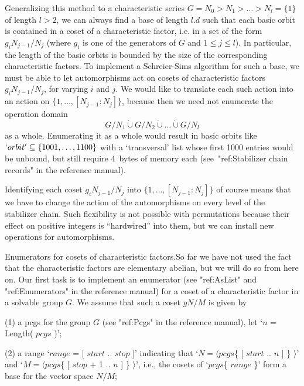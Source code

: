 Generalizing this method to a characteristic series $G=N_0 > N_1 > \ldots
> N_l=\{1\}$ of length $l>2$, we  can always find  a base of length $l.d$
such that each  basic orbit is  contained in a  coset of a characteristic
factor, i.e. in a set of the form $g_iN_{j-1}/N_j$ (where $g_i$ is one of
the generators  of $G$ and $1\le j\le  l$). In particular, the  length of
the basic  orbits   is  bounded   by  the  size  of    the  corresponding
characteristic factors. To implement a Schreier-Sims algorithm for such a
base, we  must  be   able  to  let   automorphisms  act  on   cosets   of
characteristic  factors $g_iN_{j-1}/N_j$, for  varying  $i$  and $j$.  We
would    like to    translate each such     action  into  an  action   on
$\{1,\ldots,[N_{j-1}\mathbin: N_j]\}$, because then we need not enumerate
the operation domain
$$
   G/N_1 \mathbin{\dot\cup} G/N_2 \mathbin{\dot\cup} \ldots %
         \mathbin{\dot\cup} G/N_l 
$$
as a whole. Enumerating it  as a whole would result  in basic orbits like
$`orbit'\subseteq \{1001,\ldots,1100\}$  with a  `transversal' list whose
first 1000 entries would be unbound, but  still require 4~bytes of memory
each (see~"ref:Stabilizer chain records" in the reference manual).

Identifying   each  coset   $g_iN_{j-1}/N_j$ into   $\{1,\ldots, [N_{j-1}
\mathbin: N_j]\}$ of  course means that we have  to change the action  of
the automorphisms on     every  level of   the  stabilizer   chain.  Such
flexibility is not   possible with permutations  because their  effect on
positive  integers  is ``hardwired''  into them,  but  we can install new
operations for automorphisms.

{\bsf Enumerators for cosets of  characteristic factors.}\quad So far  we
have  not used the  fact that  the characteristic  factors are elementary
abelian, but we will do so from  here on. Our  first task is to implement
an enumerator (see "ref:AsList" and "ref:Enumerators"  in  the  reference
manual) for a coset of a characteristic factor in a solvable  group  $G$.
We assume that such a coset $gN/M$ is given by

\beginlist%

\item{(1)}  a pcgs for  the group  $G$ (see  "ref:Pcgs" in the  reference
  manual), let `$n$ = Length( $pcgs$ )';

\item{(2)} a range `$range$ = [ $start$  .. $stop$ ]' indicating that `$N
  =  \langle pcgs$\{ [ $start$  .. $n$ ] \} $\rangle$'  and `$M = \langle
  pcgs$\{  [  $stop$ + 1   .. $n$ ]  \} $\rangle$',  i.e.,  the cosets of
  `$pcgs$\{ $range$ \}' form a base for the vector space $N/M$;

